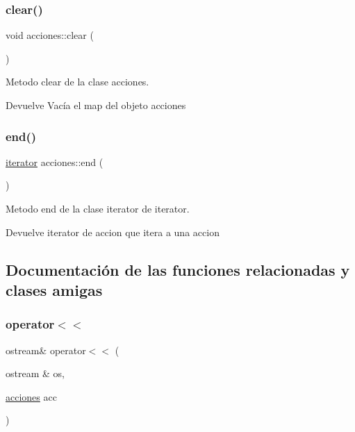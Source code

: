 \subsubsection{\texorpdfstring{clear()}{clear()}}
{\footnotesize\ttfamily void acciones\+::clear (\begin{DoxyParamCaption}{ }\end{DoxyParamCaption})}



Metodo clear de la clase acciones. 

\begin{DoxyReturn}{Devuelve}
Vacía el map del objeto acciones 
\end{DoxyReturn}
\mbox{\label{classacciones_a39de840fe3c70af83b239d6207fa70a0}} 
\subsubsection{\texorpdfstring{end()}{end()}}
{\footnotesize\ttfamily \hyperlink{classacciones_1_1iterator}{iterator} acciones\+::end (\begin{DoxyParamCaption}{ }\end{DoxyParamCaption})\hspace{0.3cm}{\ttfamily [inline]}}



Metodo end de la clase iterator de iterator. 

\begin{DoxyReturn}{Devuelve}
iterator de accion que itera a una accion 
\end{DoxyReturn}


\subsection{Documentación de las funciones relacionadas y clases amigas}
\mbox{\label{classacciones_a9a915a3074a32755bbe797613e285ce8}} 
\subsubsection{\texorpdfstring{operator$<$$<$}{operator<<}}
{\footnotesize\ttfamily ostream\& operator$<$$<$ (\begin{DoxyParamCaption}\item[{ostream \&}]{os,  }\item[{\hyperlink{classacciones}{acciones}}]{acc }\end{DoxyParamCaption})\hspace{0.3cm}{\ttfamily [friend]}}



